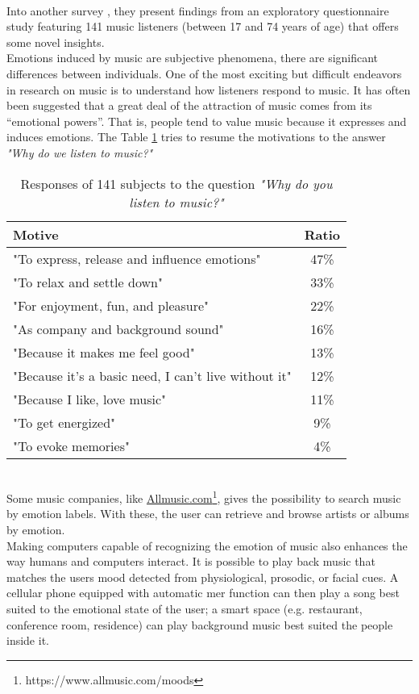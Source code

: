 \\
Into another survey \cite{juslin2004expression}, they present findings from an exploratory questionnaire study featuring 141 music listeners (between 17 and 74 years of age) that offers some novel insights. 
\\
Emotions induced by music are subjective phenomena, there are significant differences between individuals. One of the most exciting but difficult endeavors in research on music is to understand how listeners respond to music. It has often been suggested that a great deal of the attraction of music comes from its “emotional powers”. That is, people tend to value music because it expresses and induces emotions.
\newpage
The Table \ref{table:motivation_music} tries to resume the motivations to the answer \textit{"Why do we listen to music?"}
\begin{table}[h!]
	\centering
	\begin{tabular}{|l | c|}
		\hline
		Motive & Ratio\\ [0.5ex] 
		\hline\hline "To express, release and influence emotions"	&	47\%	\\ 
		\hline "To relax and settle down"										&	33\%	\\
		\hline "For enjoyment, fun, and pleasure"							&	22\%	\\
		\hline "As company and background sound"						&	16\%	\\
		\hline "Because it makes me feel good"								&	13\%	\\
		\hline "Because it's a basic need, I can't live without it"		&	12\%	\\
		\hline "Because I like, love music"										&	11\%	\\
		\hline "To get energized"													&	9\%	\\
		\hline "To evoke memories"												&	4\%	\\ 
		\hline
	\end{tabular}
	\caption{Responses of 141 subjects to the question \textit{"Why do you listen to music?"}}
	\label{table:motivation_music}
\end{table}
\\ \indent
Some music companies, like  \href{https://www.allmusic.com/moods}{Allmusic.com}\footnote{https://www.allmusic.com/moods}, gives the possibility to search music by emotion labels. With these, the user can retrieve and browse artists or albums by emotion.
\\ \indent
Making computers capable of recognizing the emotion of music also enhances the way humans and computers interact. It is possible to play back music that matches the users mood detected from physiological, prosodic, or facial cues. A cellular phone equipped with automatic \gls{mer} function can then play a song best suited to the emotional state of the user; a smart space (e.g. restaurant, conference room, residence) can play background music best suited the people inside it.

